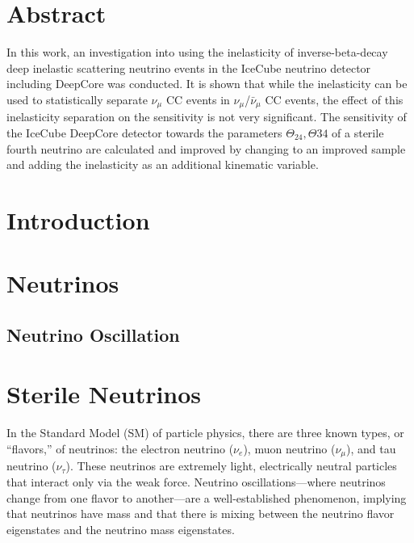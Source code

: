 \documentclass[a4paper,12pt,numbered]{article}
\title{}
\author[1]{Leon Buchholz}
\affil[1]{Humboldt Universität zu Berlin}
\date{08.02.2022}                     %
\begin{document}
\newpage\null\thispagestyle{empty}\newpage

\section*{Abstract}
In this work, an investigation into using the inelasticity of inverse-beta-decay deep inelastic scattering neutrino events in the IceCube neutrino detector including DeepCore was conducted. It is shown that while the inelasticity can be used to statistically separate $\nu_\mu$ CC events in $\nu_\mu$/$\bar{\nu}_\mu$ CC events, the effect of this inelasticity separation on the sensitivity is not very significant. The sensitivity of the IceCube DeepCore detector towards the parameters $\Theta_{24},\Theta{34}$ of a sterile fourth neutrino are calculated and improved by changing to an improved sample and adding the inelasticity as an additional kinematic variable.
\newpage

\tableofcontents

\section{Introduction}

\section{Neutrinos}
\subsection{Neutrino Oscillation}

\section{Sterile Neutrinos}

In the Standard Model (SM) of particle physics, there are three known types, or ``flavors,'' of neutrinos: the electron neutrino ($\nu_e$), muon neutrino ($\nu_\mu$), and tau neutrino ($\nu_\tau$). These neutrinos are extremely light, electrically neutral particles that interact only via the weak force. Neutrino oscillations—where neutrinos change from one flavor to another—are a well-established phenomenon, implying that neutrinos have mass and that there is mixing between the neutrino flavor eigenstates and the neutrino mass eigenstates.
\end{document}
